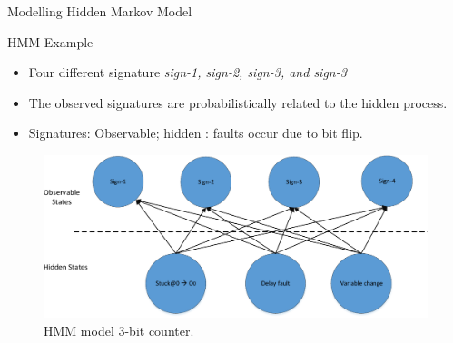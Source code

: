 \documentclass[aspectratio=1610]{beamer}
\begin{document}
\begin{frame}{Modelling Hidden Markov Model}

\begin{block}{HMM-Example}

\end{block}

\begin{itemize}

\item Four different signature \textit{sign-1, sign-2, sign-3, and sign-3}

\item The observed signatures are probabilistically related to the hidden process. 

\item Signatures: Observable; hidden : faults occur due to bit flip.


\end{itemize}




\begin{figure}[tb!]
 \centering
  \captionsetup{justification=centering}    
   \includegraphics[scale=0.5]{Figures/HMM.pdf}
   \caption{HMM model 3-bit counter.}
\label{fig:HMM-3-bit}
\end{figure}
\end{frame}
\end{document}
